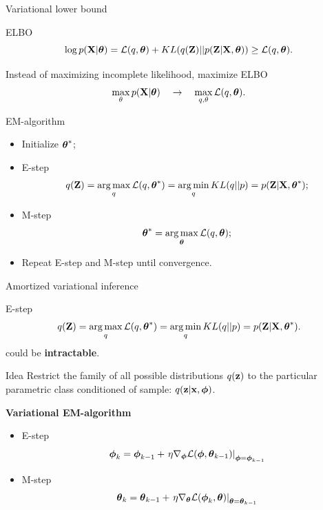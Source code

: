 \begin{frame}{Variational lower bound}
	\begin{block}{ELBO}
		\vspace{-0.1cm}
		\[
		\log p(\mathbf{X}| \boldsymbol{\theta}) = \mathcal{L} (q, \boldsymbol{\theta}) + KL(q(\mathbf{Z}) || p(\mathbf{Z}|\mathbf{X}, \boldsymbol{\theta})) \geq \mathcal{L} (q, \boldsymbol{\theta}).
		\]
	\end{block}
	Instead of maximizing incomplete likelihood, maximize ELBO
	\[
		\max_{\theta} p(\mathbf{X} | \boldsymbol{\theta}) \quad \rightarrow \quad \max_{q, \theta} \mathcal{L} (q, \boldsymbol{\theta}).
	\]
	\vspace{-0.4cm}
	\begin{block}{EM-algorithm}
		\begin{itemize}
			\item Initialize $\boldsymbol{\theta}^*$;
			\item E-step
			\[
			q(\mathbf{Z}) = \operatorname*{arg\,max}_q \mathcal{L} (q, \boldsymbol{\theta}^*) = \operatorname*{arg\,min}_q KL(q || p) =
			p(\mathbf{Z}| \mathbf{X}, \boldsymbol{\theta}^*);
			\]
			\item M-step
			\[
			\boldsymbol{\theta}^* = \operatorname*{arg\,max}_{\boldsymbol{\theta}} \mathcal{L} (q, \boldsymbol{\theta});
			\]
			\item Repeat E-step and M-step until convergence.
		\end{itemize}
	\end{block}

\end{frame}
\begin{frame}{Amortized variational inference}
	\begin{block}{E-step}
		\vspace{-0.3cm}
		\[
		q(\mathbf{Z}) = \operatorname*{arg\,max}_q \mathcal{L} (q, \boldsymbol{\theta}^*) = \operatorname*{arg\,min}_q KL(q || p) =
		p(\mathbf{Z}| \mathbf{X}, \boldsymbol{\theta}^*).
		\]
		could be \textbf{intractable}.
	\end{block}
	\begin{block}{Idea}
		Restrict the family of all possible distributions $q(\mathbf{z})$ to the particular parametric class conditioned of sample: $q(\mathbf{z}|\mathbf{x}, \boldsymbol{\phi})$.
	\end{block}
	
	\textbf{Variational EM-algorithm}
	\begin{itemize}
		\item E-step
		\[
		\boldsymbol{\phi}_k = \boldsymbol{\phi}_{k-1} + \left.\eta \nabla_{\boldsymbol{\phi}} \mathcal{L}(\boldsymbol{\phi}, \boldsymbol{\theta}_{k-1})\right|_{\boldsymbol{\phi}=\boldsymbol{\phi}_{k-1}}
		\]
		\item M-step
		\[
		\boldsymbol{\theta}_k = \boldsymbol{\theta}_{k-1} + \left.\eta \nabla_{\boldsymbol{\theta}} \mathcal{L}(\boldsymbol{\phi}_k, \boldsymbol{\theta})\right|_{\boldsymbol{\theta}=\boldsymbol{\theta}_{k-1}}
		\]
	\end{itemize}
\end{frame}
